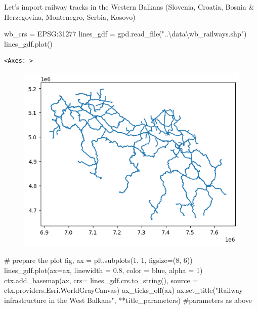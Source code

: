 \documentclass[
  letterpaper,
  DIV=11,
  numbers=noendperiod]{scrreprt}
\newenvironment{Shaded}{\begin{snugshade}}{\end{snugshade}}
\newcommand{\CommentTok}[1]{\textcolor[rgb]{0.37,0.37,0.37}{#1}}
\newcommand{\DecValTok}[1]{\textcolor[rgb]{0.68,0.00,0.00}{#1}}
\newcommand{\FloatTok}[1]{\textcolor[rgb]{0.68,0.00,0.00}{#1}}
\newcommand{\NormalTok}[1]{\textcolor[rgb]{0.00,0.23,0.31}{#1}}
\newcommand{\OperatorTok}[1]{\textcolor[rgb]{0.37,0.37,0.37}{#1}}
\newcommand{\StringTok}[1]{\textcolor[rgb]{0.13,0.47,0.30}{#1}}
\begin{document}
Let's import railway tracks in the Western Balkans (Slovenia, Croatia,
Bosnia \& Herzegovina, Montenegro, Serbia, Kosovo)

\begin{Shaded}
\begin{Highlighting}[]
\NormalTok{wb\_crs }\OperatorTok{=} \StringTok{\textquotesingle{}EPSG:31277\textquotesingle{}}
\NormalTok{lines\_gdf }\OperatorTok{=}\NormalTok{ gpd.read\_file(}\StringTok{"..\textbackslash{}data\textbackslash{}wb\_railways.shp"}\NormalTok{)}
\NormalTok{lines\_gdf.plot()}
\end{Highlighting}
\end{Shaded}

\begin{verbatim}
<Axes: >
\end{verbatim}

\begin{figure}[H]

{\centering \includegraphics{labs/w02_maps_files/figure-pdf/cell-10-output-2.png}

}

\end{figure}

\begin{Shaded}
\begin{Highlighting}[]
\CommentTok{\# prepare the plot}
\NormalTok{fig, ax }\OperatorTok{=}\NormalTok{ plt.subplots(}\DecValTok{1}\NormalTok{, }\DecValTok{1}\NormalTok{, figsize}\OperatorTok{=}\NormalTok{(}\DecValTok{8}\NormalTok{, }\DecValTok{6}\NormalTok{))}
\NormalTok{lines\_gdf.plot(ax}\OperatorTok{=}\NormalTok{ax, linewidth }\OperatorTok{=} \FloatTok{0.8}\NormalTok{, color }\OperatorTok{=} \StringTok{\textquotesingle{}blue\textquotesingle{}}\NormalTok{, alpha }\OperatorTok{=} \DecValTok{1}\NormalTok{)}
\NormalTok{ctx.add\_basemap(ax, crs}\OperatorTok{=}\NormalTok{ lines\_gdf.crs.to\_string(), source }\OperatorTok{=}\NormalTok{ ctx.providers.Esri.WorldGrayCanvas)}
\NormalTok{ax\_ticks\_off(ax)}
\NormalTok{ax.set\_title(}\StringTok{"Railway infrastructure in the West Balkans"}\NormalTok{, }\OperatorTok{**}\NormalTok{title\_parameters) }\CommentTok{\#parameters as above}
\end{Highlighting}
\end{Shaded}
\end{document}

